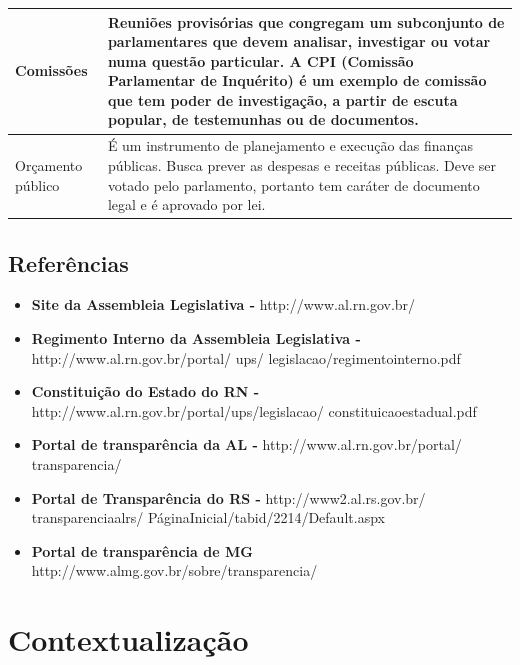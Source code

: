 \documentclass[12pt, a4paper]{article}
\begin{document}
\begin{longtabu}{X[-1] | X}
                Comissões &
                Reuniões provisórias que congregam um subconjunto de
                parlamentares que devem analisar, investigar ou votar numa
                questão particular. A CPI (Comissão Parlamentar de Inquérito) é
                um exemplo de comissão que tem poder de investigação, a partir
                de escuta popular, de testemunhas ou de documentos.
                \\ \hline

                Orçamento público &
                É um instrumento de planejamento e execução das finanças
                públicas. Busca prever as despesas e receitas públicas. Deve
                ser votado pelo parlamento, portanto tem caráter de documento
                legal e é aprovado por lei.
                \\ \hline
            \end{longtabu}

        \subsection{Referências}
        \begin{itemize}
            \item{\textbf{Site da Assembleia Legislativa -} http://www.al.rn.gov.br/}
            \item{\textbf{Regimento Interno da Assembleia Legislativa -} http://www.al.rn.gov.br/portal/ \textunderscore ups/ legislacao/regimentointerno.pdf}
            \item{\textbf{Constituição do Estado do RN -} http://www.al.rn.gov.br/portal/\textunderscore ups/legislacao/ constituicaoestadual.pdf }
            \item{\textbf{Portal de transparência da AL -} http://www.al.rn.gov.br/portal/ transparencia/}
            \item{\textbf{Portal de Transparência do RS -} http://www2.al.rs.gov.br/ transparenciaalrs/ PáginaInicial/tabid/2214/Default.aspx}
            \item{\textbf{Portal de transparência de MG} http://www.almg.gov.br/sobre/transparencia/}
        \end{itemize}

    \section{Contextualização}
\end{document}
